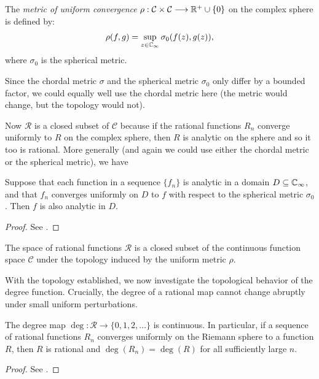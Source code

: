 \begin{definition}
    The \emph{metric of uniform convergence} $\rho : \mathcal{C} \times
    \mathcal{C} \longrightarrow \mathbb{R}^+ \cup \{0\}$ on the complex sphere is
    defined by:
    \begin{equation*}
        \rho(f, g) = \sup_{z \in \mathbb{C}_\infty} \sigma_0(f(z), g(z)),
    \end{equation*}
    where $\sigma_0$ is the spherical metric.
\end{definition}

Since the chordal metric $\sigma$ and the spherical metric $\sigma_0$ only
differ by a bounded factor, we could equally well use the chordal metric here
(the metric would change, but the topology would not).

Now $\mathcal{R}$ is a closed subset of $\mathcal{C}$ because if the rational
functions $R_n$ converge uniformly to $R$ on the complex sphere, then $R$ is
analytic on the sphere and so it too is rational. More generally (and again we
could use either the chordal metric or the spherical metric), we have

\begin{theorem}
    Suppose that each function in a sequence $\{f_n\}$ is analytic in a domain
    $D \subseteq \mathbb{C}_\infty$, and that $f_n$ converges uniformly on $D$ to $f$ with
    respect to the spherical metric $\sigma_0$. Then $f$ is also analytic in
    $D$.
\end{theorem}
\begin{proof}
    See \cite[46]{Beardon1991}.
\end{proof}

\begin{corollary}
    The space of rational functions $\mathcal{R}$ is a closed subset of the
    continuous function space $\mathcal{C}$ under the topology induced by the
    uniform metric $\rho$.
\end{corollary}

With the topology established, we now investigate the topological behavior of
the degree function. Crucially, the degree of a rational map cannot change
abruptly under small uniform perturbations.

\begin{theorem}
    \label{thm:continuity_of_degree_function}
    The degree map $\deg : \mathcal{R} \longrightarrow \{0, 1, 2, \dots\}$ is
    continuous. In particular, if a sequence of rational functions $R_n$
    converges uniformly on the Riemann sphere to a function $R$, then $R$ is
    rational and $\deg(R_n) = \deg(R)$ for all sufficiently large $n$.
\end{theorem}
\begin{proof}
    See \cite[46]{Beardon1991}.
\end{proof}

